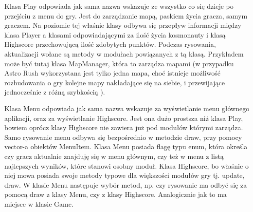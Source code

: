 Klasa Play odpowiada jak sama nazwa wskazuje ze wszystko co się dzieje po przejściu z menu do gry. Jest do zarządzanie mapą, paskiem życia gracza, samym graczem. Na poziomie tej właśnie klasy odbywa się przepływ informacji między klasa Player a klasami odpowiadającymi za ilość życia kosmonauty i klasą Highscore przechowującą ilość zdobytych punktów. Podczas rysowania, aktualizacji wołane są metody w modułach powiązanych z tą klasą. Przykładem może być tutaj klasa MapManager, która to zarządza mapami (w przypadku Astro Rush wykorzystana jest tylko jedna mapa, choć istnieje możliwość rozbudowania o gry kolejne mapy nakładające się na siebie, i przewijające jednocześnie z różną szybkością ).

Klasa Menu odpowiada jak sama nazwa wskazuje za wyświetlanie menu głównego aplikacji, oraz za wyświetlanie Highscore. Jest ona dużo prostsza niż klasa Play, bowiem oprócz klasy Highscore nie zawiera już pod modułów którymi zarządza. Samo rysowanie menu odbywa się bezpośrednio w metodzie draw, przy pomocy vector-a obiektów MenuItem. Klasa Menu posiada flagę typu enum, która określa czy gracz aktualnie znajduję się w menu głównym, czy też w menu z listą najlepszych wyników, które stanowi osobny moduł. Klasa Highscore, bo właśnie o niej mowa posiada swoje metody typowe dla większości modułów gry tj. update, draw. W klasie Menu następuje wybór metod, np. czy rysowanie ma odbyć się za pomocą draw z klasy Menu, czy z klasy Highscore. Analogicznie jak to ma miejsce w klasie Game.

